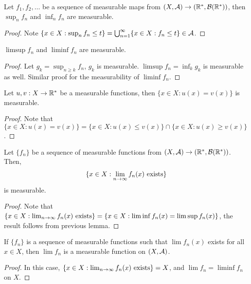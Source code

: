 \documentclass[11pt]{article}
\begin{document}
	\begin{proposition}
		Let $f_1, f_2, \dots$ be a sequence of measurable maps from $(X, \mathcal{{A}}) \to (\mathbb{R}^*, \mathcal{{B}}(\mathbb{R}^*))$, then $\sup_n f_n$ and $\inf_n f_n$ are measurable.
		\begin{proof}
			Note $\{x \in X : \sup_n f_n \leq t\} = \bigcup_{n=1}^\infty \{x \in X : f_n \leq t\} \in \mathcal{{A}}$.
		\end{proof}
	\end{proposition}
	
	\begin{corollary}
		$\limsup f_n$ and $\liminf f_n$ are measurable.
		\begin{proof}
			Let $g_k = \sup_{n \geq k} f_n$, $g_k$ is measurable. $\limsup f_n = \inf_k g_k$ is measurable as well. Similar proof for the measurability of $\liminf f_n$.
		\end{proof}
	\end{corollary}
	
	\begin{lemma}
		Let $u, v: X \to \mathbb{R}^*$ be a measurable functions, then $\{x \in X : u(x) = v(x)\}$ is measurable.
		\begin{proof}
			Note that $\{x \in X : u(x) = v(x)\} = \{x \in X : u(x) \leq v(x)\} \cap \{x \in X : u(x) \geq v(x)\}$.
		\end{proof}
	\end{lemma}
	
	\begin{corollary}
		Let $\{f_n\}$ be a sequence of measurable functions from $(X, \mathcal{{A}}) \to (\mathbb{R}^*, \mathcal{{B}}(\mathbb{R}^*))$. Then,
		\begin{align}
			\{x \in X : \lim_{n \to \infty} f_n(x) \text{{ exists}}\}
		\end{align}
		is measurable.
		\begin{proof}
			Note that $\{x \in X : \lim_{n \to \infty} f_n(x) \text{{ exists}}\} = \{x \in X :  \liminf f_n(x) = \limsup f_n(x) \}$, the result follows from previous lemma.
		\end{proof}
	\end{corollary}
	
	\begin{corollary}
		If $\{f_n\}$ is a sequence of measurable functions such that $\lim f_n(x)$ exists for all $x \in X$, then $\lim f_n$ is a measurable function on $(X, \mathcal{{A}})$.
		\begin{proof}
			In this case, $\{x \in X : \lim_{n \to \infty} f_n(x) \text{{ exists}}\} = X$, and $\lim f_n = \liminf f_n$ on $X$.
		\end{proof}
	\end{corollary}
	
\end{document}

